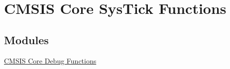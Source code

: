 \hypertarget{group___c_m_s_i_s___core___sys_tick_functions}{\section{\-C\-M\-S\-I\-S \-Core \-Sys\-Tick \-Functions}
\label{group___c_m_s_i_s___core___sys_tick_functions}
}
\subsection*{\-Modules}
\begin{DoxyCompactItemize}
\item 
\hyperlink{group___c_m_s_i_s__core___debug_functions}{\-C\-M\-S\-I\-S Core Debug Functions}
\end{DoxyCompactItemize}
